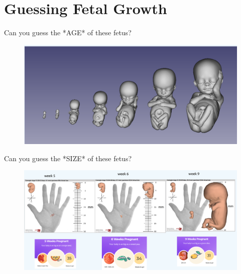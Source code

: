 \section{Guessing Fetal Growth}


{
\begin{frame}{Can you guess the *AGE* of these fetus?}
      \begin{figure}
        \centering
        \includegraphics[width=1.0\textwidth]{./figures/fetal-ages/versions/drawing-v00.png}
      \end{figure}
\end{frame}
}

{
\begin{frame}{Can you guess the *SIZE* of these fetus?}
      \begin{figure}
        \centering
        \includegraphics[width=1.0\textwidth]{./figures/fetal-size/versions/drawing-v00.png}
      \end{figure}
\end{frame}
}

